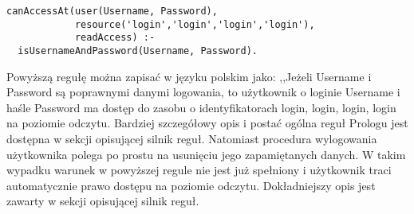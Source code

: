 \documentclass{classrep}
\begin{document}
\begin{verbatim}
canAccessAt(user(Username, Password),
            resource('login','login','login','login'),
            readAccess) :-
  isUsernameAndPassword(Username, Password).
\end{verbatim}

Powyższą regułę można zapisać w języku polskim jako: ,,Jeżeli Username i Password są poprawnymi danymi logowania, to użytkownik o loginie Username i haśle Password ma dostęp do
zasobu o identyfikatorach login, login, login, login na poziomie odczytu. Bardziej szczegółowy opis i postać ogólna reguł Prologu jest dostępna w sekcji opisującej silnik reguł.
Natomiast procedura wylogowania użytkownika polega po prostu na usunięciu jego zapamiętanych danych. W takim wypadku warunek w powyższej regule nie jest już spełniony i użytkownik traci
automatycznie prawo dostępu na poziomie odczytu. Dokładniejszy opis jest zawarty w sekcji opisującej silnik reguł.
\end{document}
